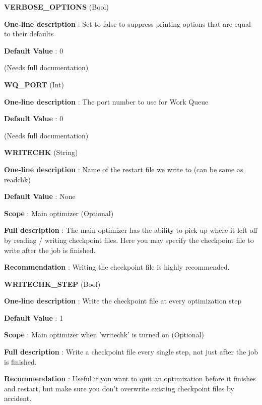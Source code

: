 \begin{DoxyItemize}
\item {\bfseries  \-V\-E\-R\-B\-O\-S\-E\-\_\-\-O\-P\-T\-I\-O\-N\-S } (\-Bool) \par
{\bfseries  \-One-\/line description }\-: \-Set to false to suppress printing options that are equal to their defaults \par
{\bfseries  \-Default \-Value }\-: 0 \par
(\-Needs full documentation)\end{DoxyItemize}
\begin{DoxyItemize}
\item {\bfseries  \-W\-Q\-\_\-\-P\-O\-R\-T } (\-Int) \par
{\bfseries  \-One-\/line description }\-: \-The port number to use for \-Work \-Queue \par
{\bfseries  \-Default \-Value }\-: 0 \par
(\-Needs full documentation)\end{DoxyItemize}
\begin{DoxyItemize}
\item {\bfseries  \-W\-R\-I\-T\-E\-C\-H\-K } (\-String) \par
{\bfseries  \-One-\/line description }\-: \-Name of the restart file we write to (can be same as readchk) \par
{\bfseries  \-Default \-Value }\-: \-None \par
{\bfseries  \-Scope }\-: \-Main optimizer (\-Optional) \par
{\bfseries  \-Full description }\-: \-The main optimizer has the ability to pick up where it left off by reading / writing checkpoint files. \-Here you may specify the checkpoint file to write after the job is finished. \par
{\bfseries  \-Recommendation }\-: \-Writing the checkpoint file is highly recommended.\end{DoxyItemize}
\begin{DoxyItemize}
\item {\bfseries  \-W\-R\-I\-T\-E\-C\-H\-K\-\_\-\-S\-T\-E\-P } (\-Bool) \par
{\bfseries  \-One-\/line description }\-: \-Write the checkpoint file at every optimization step \par
{\bfseries  \-Default \-Value }\-: 1 \par
{\bfseries  \-Scope }\-: \-Main optimizer when 'writechk' is turned on (\-Optional) \par
{\bfseries  \-Full description }\-: \-Write a checkpoint file every single step, not just after the job is finished. \par
{\bfseries  \-Recommendation }\-: \-Useful if you want to quit an optimization before it finishes and restart, but make sure you don't overwrite existing checkpoint files by accident.\end{DoxyItemize}
